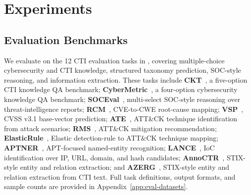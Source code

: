 \section{Experiments}


\subsection{Evaluation Benchmarks}
\label{sec:eval-benchmarks}

We evaluate on the 12 CTI evaluation tasks in , covering multiple-choice cybersecurity and CTI knowledge, structured taxonomy prediction, SOC-style reasoning, and information extraction. These tasks include \textbf{CKT}~\citep{alam2025athenabench}, a five-option CTI knowledge QA benchmark; \textbf{CyberMetric}~\citep{cybermetric}, a four-option cybersecurity knowledge QA benchmark; \textbf{SOCEval}~\citep{deason2025cybersoceval}, multi-select SOC-style reasoning over threat-intelligence reports; \textbf{RCM}~\citep{alam2025athenabench}, CVE-to-CWE root-cause mapping; \textbf{VSP}~\citep{alam2025athenabench}, CVSS v3.1 base-vector prediction; \textbf{ATE}~\citep{alam2025athenabench}, ATT\&CK technique identification from attack scenarios; \textbf{RMS}~\citep{alam2025athenabench}, ATT\&CK mitigation recommendation; \textbf{ElasticRule}~\citep{elastic_detection_rules}, Elastic detection-rule to ATT\&CK technique mapping; \textbf{APTNER}~\citep{wang2022aptner}, APT-focused named-entity recognition; \textbf{LANCE}~\citep{froudakis2025revealing}, IoC identification over IP, URL, domain, and hash candidates; \textbf{AnnoCTR}~\citep{lange2024annoctr}, STIX-style entity and relation extraction; and \textbf{AZERG}~\citep{lekssays2025text}, STIX-style entity and relation extraction from CTI text. Full task definitions, output formats, and sample counts are provided in Appendix~\ref{app:eval-datasets}.

